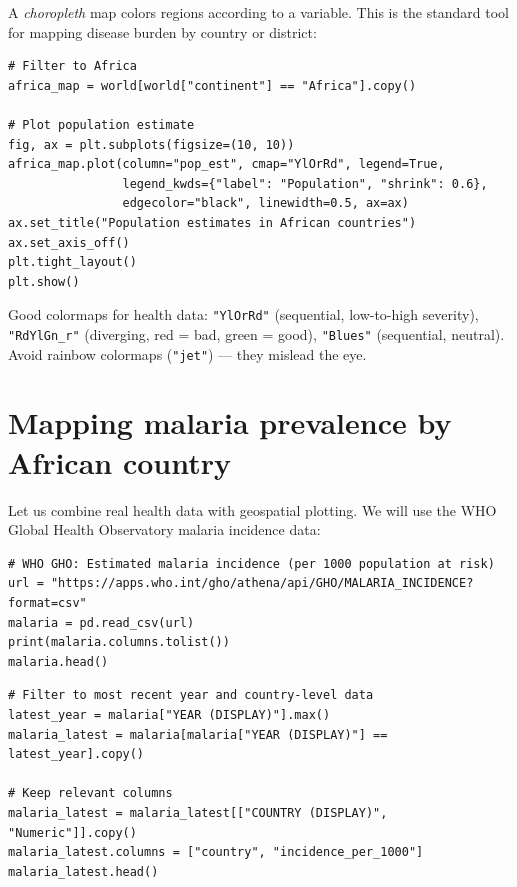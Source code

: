 A \emph{choropleth} map colors regions according to a variable. This is the standard tool for mapping disease burden by country or district:

\begin{verbatim}
# Filter to Africa
africa_map = world[world["continent"] == "Africa"].copy()

# Plot population estimate
fig, ax = plt.subplots(figsize=(10, 10))
africa_map.plot(column="pop_est", cmap="YlOrRd", legend=True,
                legend_kwds={"label": "Population", "shrink": 0.6},
                edgecolor="black", linewidth=0.5, ax=ax)
ax.set_title("Population estimates in African countries")
ax.set_axis_off()
plt.tight_layout()
plt.show()
\end{verbatim}

\begin{pythontip}
Good colormaps for health data: \texttt{"YlOrRd"} (sequential, low-to-high severity), \texttt{"RdYlGn\_r"} (diverging, red = bad, green = good), \texttt{"Blues"} (sequential, neutral). Avoid rainbow colormaps (\texttt{"jet"}) --- they mislead the eye.
\end{pythontip}

\section{Mapping malaria prevalence by African country}

Let us combine real health data with geospatial plotting. We will use the WHO Global Health Observatory malaria incidence data:

\begin{verbatim}
# WHO GHO: Estimated malaria incidence (per 1000 population at risk)
url = "https://apps.who.int/gho/athena/api/GHO/MALARIA_INCIDENCE?format=csv"
malaria = pd.read_csv(url)
print(malaria.columns.tolist())
malaria.head()
\end{verbatim}

\begin{verbatim}
# Filter to most recent year and country-level data
latest_year = malaria["YEAR (DISPLAY)"].max()
malaria_latest = malaria[malaria["YEAR (DISPLAY)"] == latest_year].copy()

# Keep relevant columns
malaria_latest = malaria_latest[["COUNTRY (DISPLAY)", "Numeric"]].copy()
malaria_latest.columns = ["country", "incidence_per_1000"]
malaria_latest.head()
\end{verbatim}

